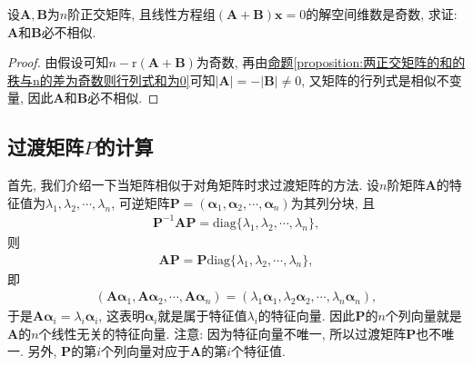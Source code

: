 \documentclass[../../main.tex]{subfiles}%
\begin{document}
\begin{example}
设\(\boldsymbol{A},\boldsymbol{B}\)为\(n\)阶正交矩阵, 且线性方程组\((\boldsymbol{A}+\boldsymbol{B})\boldsymbol{x} = 0\)的解空间维数是奇数, 求证: \(\boldsymbol{A}\)和\(\boldsymbol{B}\)必不相似.
\end{example}
\begin{proof}

由假设可知\(n - \mathrm{r}(\boldsymbol{A}+\boldsymbol{B})\)为奇数, 再由\hyperref[proposition:两正交矩阵的和的秩与n的差为奇数则行列式和为0]{命题\ref{proposition:两正交矩阵的和的秩与n的差为奇数则行列式和为0}}可知\(\vert\boldsymbol{A}\vert = -\vert\boldsymbol{B}\vert\neq 0\), 又矩阵的行列式是相似不变量, 因此\(\boldsymbol{A}\)和\(\boldsymbol{B}\)必不相似. 

\end{proof}

\subsection{过渡矩阵$P$的计算}

首先, 我们介绍一下当矩阵相似于对角矩阵时求过渡矩阵的方法. 设\(n\)阶矩阵\(\boldsymbol{A}\)的特征值为\(\lambda_{1},\lambda_{2},\cdots,\lambda_{n}\), 可逆矩阵\(\boldsymbol{P}=(\boldsymbol{\alpha}_{1},\boldsymbol{\alpha}_{2},\cdots,\boldsymbol{\alpha}_{n})\)为其列分块, 且
\begin{align*}
\boldsymbol{P}^{-1}\boldsymbol{AP}=\mathrm{diag}\{\lambda_{1},\lambda_{2},\cdots,\lambda_{n}\},
\end{align*}
则
\begin{align*}
\boldsymbol{AP}=\boldsymbol{P}\mathrm{diag}\{\lambda_{1},\lambda_{2},\cdots,\lambda_{n}\},
\end{align*}
即
\begin{align*}
(\boldsymbol{A}\boldsymbol{\alpha}_{1},\boldsymbol{A}\boldsymbol{\alpha}_{2},\cdots,\boldsymbol{A}\boldsymbol{\alpha}_{n})=(\lambda_{1}\boldsymbol{\alpha}_{1},\lambda_{2}\boldsymbol{\alpha}_{2},\cdots,\lambda_{n}\boldsymbol{\alpha}_{n}),
\end{align*}
于是\(\boldsymbol{A}\boldsymbol{\alpha}_{i}=\lambda_{i}\boldsymbol{\alpha}_{i}\), 这表明\(\boldsymbol{\alpha}_{i}\)就是属于特征值\(\lambda_{i}\)的特征向量. 因此\(\boldsymbol{P}\)的\(n\)个列向量就是\(\boldsymbol{A}\)的\(n\)个线性无关的特征向量. 注意: 因为特征向量不唯一, 所以过渡矩阵\(\boldsymbol{P}\)也不唯一. 另外, \(\boldsymbol{P}\)的第\(i\)个列向量对应于\(\boldsymbol{A}\)的第\(i\)个特征值. 
\end{document}
